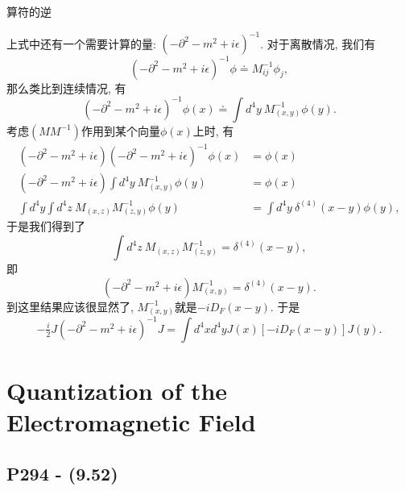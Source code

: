 \begin{mybox}{算符的逆}

  \mbox{}

  上式中还有一个需要计算的量: $(-\partial^2-m^2+i\epsilon)^{-1}$.
  对于离散情况, 我们有
  \begin{equation}
    (-\partial^2-m^2+i\epsilon)^{-1}\phi \doteq M^{-1}_{ij}\phi_j,
  \end{equation}
  那么类比到连续情况, 有
  \begin{equation}
    (-\partial^2-m^2+i\epsilon)^{-1}\phi(x) \doteq \int d^4y\ M^{-1}_{(x,y)}\phi(y).
  \end{equation}
  考虑$(MM^{-1})$作用到某个向量$\phi(x)$上时, 有
  \begin{equation}
    \begin{aligned}
      (-\partial^2-m^2+i\epsilon)(-\partial^2-m^2+i\epsilon)^{-1}\phi(x) & = \phi(x)                              \\
      (-\partial^2-m^2+i\epsilon) \int d^4y\ M^{-1}_{(x,y)}\phi(y)       & = \phi(x)                              \\
      \int d^4y \int d^4z\ M_{(x,z)}M^{-1}_{(z,y)}\phi(y)                & = \int d^4y\ \delta^{(4)}(x-y)\phi(y),
    \end{aligned}
  \end{equation}
  于是我们得到了
  \begin{equation}
    \int d^4z\ M_{(x,z)}M^{-1}_{(z,y)} = \delta^{(4)} (x-y),
  \end{equation}
  即
  \begin{equation}
    (-\partial^2-m^2+i\epsilon)M^{-1}_{(x,y)} = \delta^{(4)} (x-y).
  \end{equation}
  到这里结果应该很显然了, $M^{-1}_{(x,y)}$就是$-iD_F(x-y)$.
  于是
  \begin{equation}
    -\tfrac{i}{2}J(-\partial^2-m^2+i\epsilon)^{-1}J = \int d^4x d^4y J(x)[-iD_F(x-y)] J(y).
  \end{equation}
\end{mybox}

\setcounter{section}{3}

\section{Quantization of the Electromagnetic Field}

\subsection{P294 - (9.52)}

